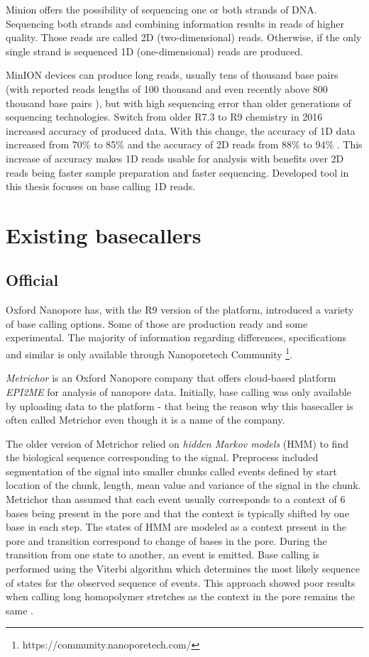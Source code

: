 \documentclass[times, utf8, diplomski, english]{fer}
\begin{document}
Minion offers the possibility of sequencing one or both strands of DNA. Sequencing both strands and combining information results in reads of higher quality. Those reads are called 2D (two-dimensional) reads. Otherwise, if the only single strand is sequenced 1D (one-dimensional) reads are produced.

MinION devices can produce long reads, usually tens of thousand base pairs (with reported reads lengths of 100 thousand \cite{loman1-100k} and even recently above 800 thousand base pairs \cite{loman2-800k}), but with high sequencing error than older generations of sequencing technologies.
Switch from older R7.3 to  R9 chemistry in 2016 increased accuracy of produced data. With this change, the accuracy of 1D data increased from 70\% to 85\% and the accuracy of 2D reads from 88\% to 94\% \cite{nanopore_video}.  This increase of accuracy makes 1D reads usable for analysis with benefits over 2D reads being faster sample preparation and faster sequencing. Developed tool in this thesis focuses on base calling 1D reads.


  
\section{Existing basecallers}

\subsection{Official}
Oxford Nanopore has, with the R9 version of the platform, introduced a variety of base calling options. Some of those are production ready and some experimental. The majority of information regarding differences, specifications and similar is only available through Nanoporetech Community \footnote{https://community.nanoporetech.com/}.


\textit{Metrichor} is an Oxford Nanopore company that offers cloud-based platform \textit{EPI2ME} for analysis of nanopore data. 
Initially, base calling was only available by uploading data to the platform - that being the reason why this basecaller is often called Metrichor even though it is a name of the company.

The older version of Metrichor relied on \textit{hidden Markov models} (HMM) to find the biological sequence corresponding to the signal. Preprocess included segmentation of the signal into smaller chunks called events defined by start location of the chunk, length, mean value and variance of the signal in the chunk. Metrichor than assumed that each event usually corresponds to a context of 6 bases being present in the pore and that the context is typically shifted by one base in each step. 
The states of HMM are modeled as a context present in the pore and transition correspond to change of bases in the pore. During the transition from one state to another, an event is emitted. Base calling is performed using the Viterbi algorithm which determines the most likely sequence of states for the observed sequence of events. This approach showed poor results when calling long homopolymer stretches as the context in the pore remains the same \cite{homopolymers}\cite{homopolimeri_analiza}.
\end{document}

